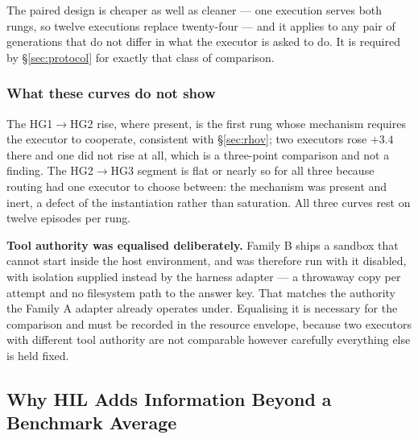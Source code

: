 \documentclass[11pt]{article}
\theoremstyle{definition}
\begin{document}
The paired design is cheaper as well as cleaner --- one execution serves both
rungs, so twelve executions replace twenty-four --- and it applies to any pair of
generations that do not differ in what the executor is asked to do. It is
required by \S\ref{sec:protocol} for exactly that class of comparison.

\subsubsection{What these curves do not show}

The HG1$\to$HG2 rise, where present, is the first rung whose mechanism requires the executor to cooperate, consistent with \S\ref{sec:rhov}; two executors rose $+3.4$ there and one did not rise at all, which is a three-point comparison and not a finding. The HG2$\to$HG3 segment is flat or nearly so for all three because routing had one executor to choose between: the mechanism was present and inert, a defect of the instantiation rather than saturation. All three curves rest on twelve episodes per rung.

\textbf{Tool authority was equalised deliberately.} Family B ships a sandbox that cannot start inside the host environment, and was therefore run with it disabled, with isolation supplied instead by the harness adapter --- a throwaway copy per attempt and no filesystem path to the answer key. That matches the authority the Family A adapter already operates under. Equalising it is necessary for the comparison and must be recorded in the resource envelope, because two executors with different tool authority are not comparable however carefully everything else is held fixed.

\subsection{Why HIL Adds Information Beyond a Benchmark Average}
\end{document}
